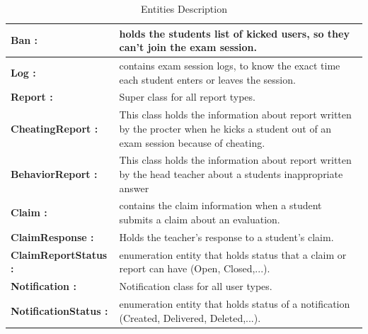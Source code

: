 \documentclass[]{uc2pfecaneva}
\begin{document}
    \begin{table}[t]
        \begin{tabularx}{\textwidth}{|l|X|}
            \hline
            \textbf{Ban :} & holds the students list of kicked users, so they can't join the exam session.\\ \hline
            \textbf{Log :} & contains exam session logs, to know the exact time each student enters or leaves the session.\\ \hline
            \textbf{Report :} & Super class for all report types.\\ \hline
            \textbf{CheatingReport :} & This class holds the information about report written by the procter when he kicks a student out of an exam session because of cheating.\\ \hline
            \textbf{BehaviorReport :} & This class holds the information about report written by the head teacher about a students inappropriate answer\\ \hline
            \textbf{Claim :} & contains the claim information when a student submits a claim about an evaluation.\\ \hline
            \textbf{ClaimResponse :} & Holds the teacher's response to a student's claim.\\ \hline
            \textbf{ClaimReportStatus :} & enumeration entity that holds status that a claim or report can have (Open, Closed,...).\\ \hline
            \textbf{Notification :} & Notification class for all user types.\\ \hline
            \textbf{NotificationStatus :} &  enumeration entity that holds status of a notification (Created, Delivered, Deleted,...).\\ \hline
        \end{tabularx}
        \caption{Entities Description}
        \label{table:1}
    \end{table}
\end{document}
